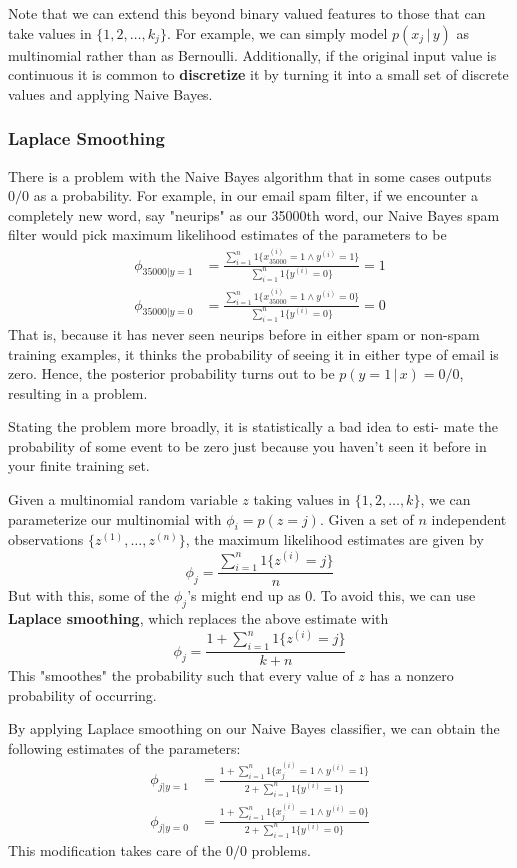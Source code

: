 \documentclass[a4paper, 12pt]{report}
\theoremstyle{remark}
\theoremstyle{definition}
\begin{document}
Note that we can extend this beyond binary valued features to those that can take values in $\{1, 2, \ldots, k_j\}$. For example, we can simply model $p(x_j\,|\,y)$ as multinomial rather than as Bernoulli. Additionally, if the original input value is continuous it is common to \textbf{discretize} it by turning it into a small set of discrete values and applying Naive Bayes. 

\subsubsection{Laplace Smoothing}
There is a problem with the Naive Bayes algorithm that in some cases outputs $0/0$ as a probability. For example, in our email spam filter, if we encounter a completely new word, say "neurips" as our 35000th word, our Naive Bayes spam filter would pick maximum likelihood estimates of the parameters to be 
\begin{align*}
    \phi_{35000|y=1} & = \frac{\sum_{i=1}^n 1\{ x_{35000}^{(i)} = 1 \wedge y^{(i)} = 1\}}{\sum_{i=1}^n 1\{y^{(i)} = 0\}} = 1\\
    \phi_{35000|y=0} & = \frac{\sum_{i=1}^n 1\{ x_{35000}^{(i)} = 1 \wedge y^{(i)} = 0\}}{\sum_{i=1}^n 1\{y^{(i)} = 0\}} = 0 
\end{align*}
That is, because it has never seen neurips before in either spam or non-spam training examples, it thinks the probability of seeing it in either type of email is zero. Hence, the posterior probability turns out to be $p(y=1\,|\,x) = 0/0$, resulting in a problem. 

Stating the problem more broadly, it is statistically a bad idea to esti- mate the probability of some event to be zero just because you haven’t seen it before in your finite training set. 

Given a multinomial random variable $z$ taking values in $\{1, 2, \ldots, k\}$, we can parameterize our multinomial with $\phi_i = p(z=j)$. Given a set of $n$ independent observations $\{z^{(1)}, \ldots, z^{(n)}\}$, the maximum likelihood estimates are given by 
\[\phi_j = \frac{\sum_{i=1}^n 1\{z^{(i)} = j\}}{n}\]
But with this, some of the $\phi_j$'s might end up as $0$. To avoid this, we can use \textbf{Laplace smoothing}, which replaces the above estimate with 
\[\phi_j = \frac{1 + \sum_{i=1}^n 1\{z^{(i)} = j\}}{k+n}\]
This "smoothes" the probability such that every value of $z$ has a nonzero probability of occurring. 

By applying Laplace smoothing on our Naive Bayes classifier, we can obtain the following estimates of the parameters: 
\begin{align*}
    \phi_{j|y=1} & = \frac{1 + \sum_{i=1}^n 1\{ x_j^{(i)} = 1 \wedge y^{(i)} = 1\}}{2 + \sum_{i=1}^n 1\{y^{(i)} = 1\}} \\
    \phi_{j|y=0} & = \frac{1 + \sum_{i=1}^n 1\{x_j^{(i)} = 1 \wedge y^{(i)} = 0\}}{2 + \sum_{i=1}^n 1\{y^{(i)} = 0\}} 
\end{align*}
This modification takes care of the $0/0$ problems. 
\end{document}
